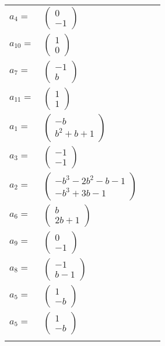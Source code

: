 \documentclass[1p]{elsarticle_modified}
\theoremstyle{definition}
\begin{document}
\begin{tabular}{m{7pt} m{180pt} m{7pt} m{180pt} }
\flushright $a_{4}=$&$\begin{pmatrix}0\\-1\end{pmatrix}$ \\
\flushright $a_{10}=$&$\begin{pmatrix}1\\0\end{pmatrix}$ \\
\flushright $a_{7}=$&$\begin{pmatrix}-1\\b\end{pmatrix}$ \\
\flushright $a_{11}=$&$\begin{pmatrix}1\\1\end{pmatrix}$ \\
\flushright $a_{1}=$&$\begin{pmatrix}- b\\b^2+b+1\end{pmatrix}$ \\
\flushright $a_{3}=$&$\begin{pmatrix}-1\\-1\end{pmatrix}$ \\
\flushright $a_{2}=$&$\begin{pmatrix}- b^3-2 b^2- b-1\\- b^3+3 b-1\end{pmatrix}$ \\
\flushright $a_{6}=$&$\begin{pmatrix}b\\2 b+1\end{pmatrix}$ \\
\flushright $a_{9}=$&$\begin{pmatrix}0\\-1\end{pmatrix}$ \\
\flushright $a_{8}=$&$\begin{pmatrix}-1\\b-1\end{pmatrix}$ \\
\flushright $a_{5}=$&$\begin{pmatrix}1\\- b\end{pmatrix}$\\ \flushright $a_{5}=$&$\begin{pmatrix}1\\- b\end{pmatrix}$\\&\end{tabular}
\end{document}
